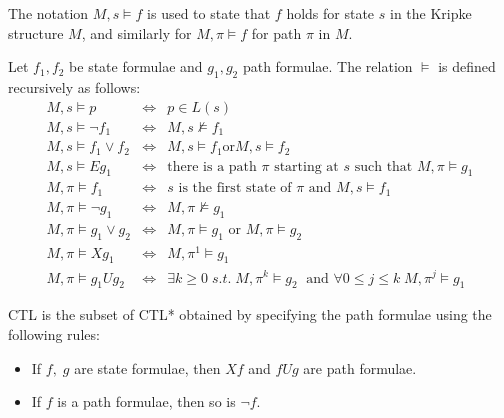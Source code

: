\documentclass[11pt]{article}
\begin{document}
        The notation $M, s \models f$ is used to state that $f$ holds for state
        $s$ in the Kripke structure $M$, and similarly for $M, \pi \models f$ for
        path $\pi$ in $M$.

        \begin{definition}
            Let $f_1, f_2$ be state formulae and $g_1, g_2$ path formulae. 
            The relation $\models$ is defined recursively as follows:
            \begin{eqnarray}
                M,s \models p &\iff & p\in L(s) \\
                M,s \models \neg f_1 &\iff &M,s \not\models f_1 \\
                M,s \models f_1 \vee f_2 &\iff & M,s \models f_1 \text{or} M,s \models f_2 \\
                M,s \models Eg_1 &\iff &\text{there is a path $\pi$ starting at $s$ such
                that $M, \pi \models g_1$}\\
                M, \pi \models f_1 &\iff & s \text{ is the first state of $\pi$ and }
                M,s \models f_1 \\
                M, \pi \models \neg g_1 &\iff &M,\pi \not\models g_1\\
                M,\pi \models g_1 \vee g_2 &\iff & M,\pi \models g_1 \text{ or } M,\pi \models g_2 \\
                M, \pi \models Xg_1 &\iff &M,\pi^1 \models g_1\\
                M,\pi \models g_1Ug_2 &\iff &\exists k\geq 0\; s.t.\; M,\pi^k\models g_2\;
                \text{ and } \forall 0\leq j\leq k\; M,\pi^j \models g_1
            \end{eqnarray}
        \end{definition}

        \begin{definition}
            CTL is the subset of CTL* obtained by specifying the path formulae using
            the following rules\cite{ltl}:
            \begin{itemize}
                \item
                    If $f,\;g$ are state formulae, then $Xf$ and $fUg$ are path
                    formulae.
                \item
                    If $f$ is a path formulae, then so is $\neg f$.
            \end{itemize}
        \end{definition}
\end{document}
